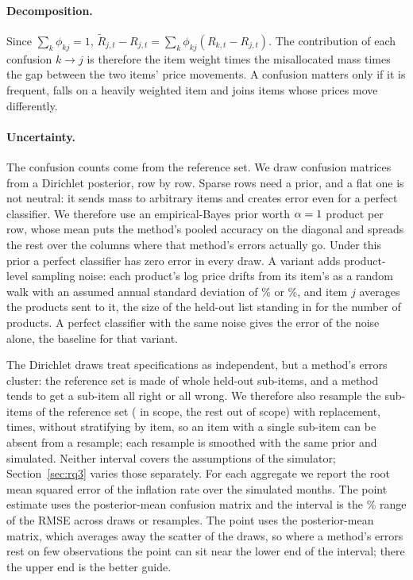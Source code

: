 \paragraph{Decomposition.} Since $\sum_k \phi_{kj} = 1$,
$\tilde R_{j,t} - R_{j,t} = \sum_k \phi_{kj}(R_{k,t} - R_{j,t})$. The contribution of each
confusion $k \to j$ is therefore the item weight times the misallocated mass times the gap
between the two items' price movements. A confusion matters only if it is frequent, falls on
a heavily weighted item and joins items whose prices move differently.

\paragraph{Uncertainty.} The confusion counts come from the reference set. We draw
\CfgDraws{} confusion matrices from a
Dirichlet posterior, row by row. Sparse rows need a prior, and a flat one is not neutral: it
sends mass to arbitrary items and creates error even for a perfect classifier. We therefore
use an empirical-Bayes prior worth $\alpha = 1$ product per row, whose mean puts the
method's pooled accuracy on the diagonal and spreads the rest over the columns where that
method's errors actually go. Under this prior a perfect classifier has zero error in every
draw. A variant adds product-level sampling noise: each product's log price drifts from its
item's as a random walk with an assumed annual standard deviation of \CfgSigmaLo\% or
\CfgSigmaHi\%, and item $j$ averages the products sent to it, the size of the held-out list
standing in for the number of products. A perfect classifier with the same noise gives the
error of the noise alone, the baseline for that variant.

The Dirichlet draws treat specifications as independent, but a method's errors cluster: the
reference set is made of whole held-out sub-items, and a method tends to get a sub-item all
right or all wrong. We therefore also resample the \NClusters{} sub-items of the reference set
(\NRefSubitems{} in scope, the rest out of scope) with replacement, \CfgDraws{} times, without
stratifying by item, so an item with a single sub-item can be absent from a resample; each
resample is smoothed with the same prior and simulated.
Neither interval covers the assumptions of the simulator; Section~\ref{sec:rq3} varies
those separately.
For each aggregate we report the root mean squared error of the inflation rate over the
simulated months. The point estimate uses the posterior-mean confusion matrix and the
interval is the \CfgCI\% range of the RMSE across draws or resamples. The point uses the posterior-mean matrix, which
averages away the scatter of the draws, so where a method's errors rest on few observations
the point can sit near the lower end of the interval; there the upper end is the better guide.
